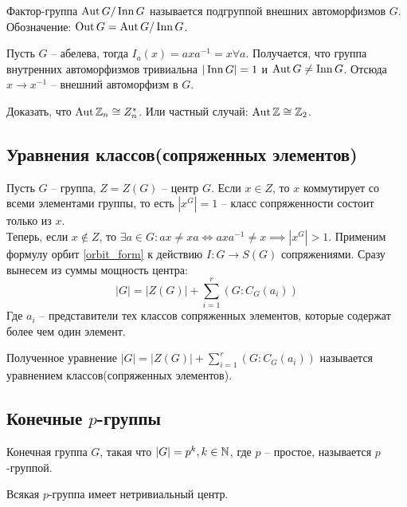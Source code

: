 \begin{definition}
    Фактор-группа $\operatorname{Aut} G/ \operatorname{Inn} G$ называется подгруппой внешних автоморфизмов $G$. Обозначение: $\operatorname{Out} G = \operatorname{Aut} G/ \operatorname{Inn} G$.
\end{definition}

\begin{example}
    Пусть $G$ -- абелева, тогда $I_a(x) = axa^{-1} = x \forall a$. Получается, что группа внутренних автоморфизмов тривиальна $|\operatorname{Inn} G| = 1$ и $\operatorname{Aut} G \neq \operatorname{Inn} G$. Отсюда $x \to x^{-1}$ -- внешний автоморфизм в $G$.
\end{example}

\begin{exercise}
    Доказать, что $\operatorname{Aut} \mathbb{Z}_n \cong Z_n^*$. Или частный случай: $\operatorname{Aut} \mathbb{Z} \cong \mathbb{Z}_2$.
\end{exercise}

\subsection{Уравнения классов(сопряженных элементов)}
Пусть $G$ -- группа, $Z = Z(G)$ -- центр $G$. Если $x \in Z$, то $x$ коммутирует со всеми элементами группы, то есть $|x^G| = 1$ -- класс сопряженности состоит только из $x$. \\
Теперь, если $x \notin Z$, то $\exists a \in G: ax \neq xa \iff axa^{-1} \neq x \implies |x^G| > 1$.
Применим формулу орбит \ref{orbit_form} к действию $I: G \to S(G)$ сопряжениями. Сразу вынесем из суммы мощность центра:
$$|G| = |Z(G)| + \sum\limits_{i = 1}^r(G: C_G(a_i))$$
Где $a_i$ -- представители тех классов сопряженных элементов, которые содержат более чем один элемент.
\begin{definition}
\label{uravn_class}
    Полученное уравнение $|G| = |Z(G)| + \sum\limits_{i = 1}^r(G: C_G(a_i))$ называется уравнением классов(сопряженных элементов).
\end{definition}

\subsection{Конечные $p$-группы}

\begin{definition}
    Конечная группа $G$, такая что $|G| = p^k, k \in \mathbb{N}$, где $p$ -- простое, называется $p$-группой.
\end{definition}

\begin{theorem}
    Всякая $p$-группа имеет нетривиальный центр.
\end{theorem}

